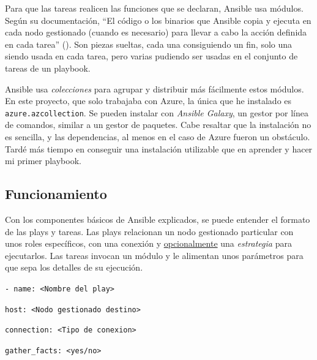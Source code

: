 \documentclass[11pt]{article}
\begin{document}
\begin{flushleft}
\clearpage
Para que las tareas realicen las funciones que se declaran, Ansible usa módulos. Según su documentación, ``El código o los binarios que Ansible copia y ejecuta en cada nodo gestionado (cuando es necesario) para llevar a cabo la acción definida en cada tarea'' (\cite{ansible_concepts}). Son piezas sueltas, cada una consiguiendo un fin, solo una siendo usada en cada tarea, pero varias pudiendo ser usadas en el conjunto de tareas de un playbook.
\linebreak

Ansible usa \textit{colecciones} para agrupar y distribuir más fácilmente estos módulos. En este proyecto, que solo trabajaba con Azure, la única que he instalado es \texttt{azure.azcollection}. Se pueden instalar con \textit{Ansible Galaxy}, un gestor por línea de comandos, similar a un gestor de paquetes. Cabe resaltar que la instalación no es sencilla, y las dependencias, al menos en el caso de Azure fueron un obstáculo. Tardé más tiempo en conseguir una instalación utilizable que en aprender y hacer mi primer playbook.
\linebreak

    \bigskip
    \bigskip
    
    \subsection{Funcionamiento}
    Con los componentes básicos de Ansible explicados, se puede entender el formato de las plays y tareas. Las plays relacionan un nodo gestionado particular con unos roles específicos, con una conexión y \underline{opcionalmente} una \textit{estrategia} para ejecutarlos. Las tareas invocan un módulo y le alimentan unos parámetros para que sepa los detalles de su ejecución.
    \linebreak

        \begin{center}
            \begin{minipage}{.4\textwidth}
                \footnotesize
                \texttt{- name: <Nombre del play>} 
            
                \hspace{2.2mm}
                \texttt{host: <Nodo gestionado destino>} 
            
                \hspace{2.2mm}
                \texttt{connection: <Tipo de conexion>}
            
                \hspace{2.2mm}
                \texttt{gather\_facts: <yes/no>}
            

\end{minipage}
\end{center}
\end{flushleft}
\end{document}
